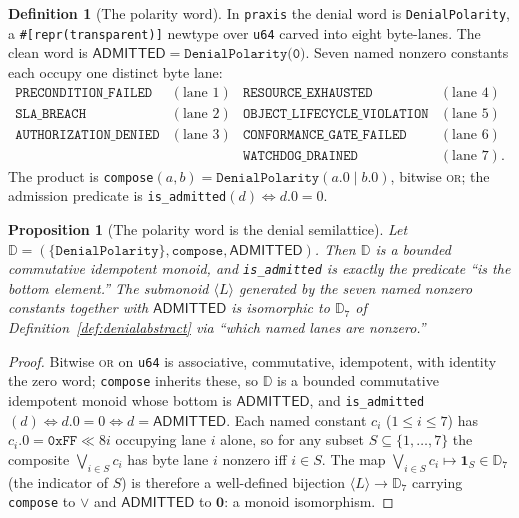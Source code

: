 \documentclass[11pt,oneside]{book}
\theoremstyle{definition}
\newtheorem{definition}{Definition}[chapter]
\theoremstyle{plain}
\newtheorem{proposition}[theorem]{Proposition}
\theoremstyle{remark}
\newcommand{\code}[1]{\texttt{#1}}
\newcommand{\Deny}{\mathbb{D}}                 %
\newcommand{\Adml}{\mathsf{ADMITTED}}          %
\begin{document}
\begin{definition}[The polarity word]\label{def:denialcode}
In \code{praxis} the denial word is \code{DenialPolarity}, a \code{\#[repr(transparent)]}
newtype over \code{u64} carved into eight byte-lanes. The clean word is
$\Adml=\code{DenialPolarity(0)}$. Seven named nonzero constants each occupy one distinct byte
lane:
\[
\begin{array}{llll}
\code{PRECONDITION\_FAILED} & (\text{lane }1) & \code{RESOURCE\_EXHAUSTED} & (\text{lane }4)\\
\code{SLA\_BREACH} & (\text{lane }2) & \code{OBJECT\_LIFECYCLE\_VIOLATION} & (\text{lane }5)\\
\code{AUTHORIZATION\_DENIED} & (\text{lane }3) & \code{CONFORMANCE\_GATE\_FAILED} & (\text{lane }6)\\
& & \code{WATCHDOG\_DRAINED} & (\text{lane }7).
\end{array}
\]
The product is \code{compose}$(a,b)=\code{DenialPolarity}(a.0\mathbin{|}b.0)$, bitwise
\textsc{or}; the admission predicate is \code{is\_admitted}$(d)\iff d.0=0$.
\end{definition}

\begin{proposition}[The polarity word is the denial semilattice]\label{prop:code_is_sl}
Let $\Deny=(\{\code{DenialPolarity}\},\code{compose},\Adml)$. Then $\Deny$ is a bounded
commutative idempotent monoid, and \code{is\_admitted} is exactly the predicate ``is the
bottom element.'' The submonoid $\langle L\rangle$ generated by the seven named nonzero
constants together with $\Adml$ is isomorphic to $\Deny_7$ of
Definition~\ref{def:denialabstract} via ``which named lanes are nonzero.''
\end{proposition}

\begin{proof}
Bitwise \textsc{or} on \code{u64} is associative, commutative, idempotent, with identity the
zero word; \code{compose} inherits these, so $\Deny$ is a bounded commutative idempotent
monoid whose bottom is $\Adml$, and \code{is\_admitted}$(d)\iff d.0=0\iff d=\Adml$. Each named
constant $c_i$ ($1\le i\le 7$) has $c_i.0=\code{0xFF}\ll 8i$ occupying lane $i$ alone, so for
any subset $S\subseteq\{1,\dots,7\}$ the composite $\bigvee_{i\in S}c_i$ has byte lane $i$
nonzero iff $i\in S$. The map $\bigvee_{i\in S}c_i\mapsto \bm 1_S\in\Deny_7$ (the indicator of
$S$) is therefore a well-defined bijection $\langle L\rangle\to\Deny_7$ carrying \code{compose}
to $\lor$ and $\Adml$ to $\bm 0$: a monoid isomorphism. \end{proof}
\end{document}
